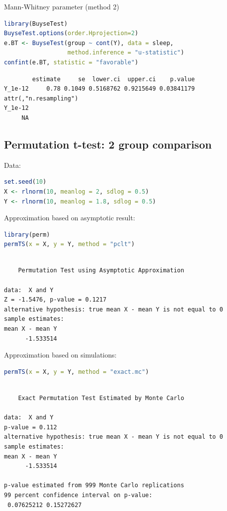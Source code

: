 \documentclass{article}
\begin{document}
Mann-Whitney parameter (method 2)
\begin{lstlisting}[language=r,numbers=none]
library(BuyseTest)
BuyseTest.options(order.Hprojection=2)
e.BT <- BuyseTest(group ~ cont(Y), data = sleep, 
                  method.inference = "u-statistic")
confint(e.BT, statistic = "favorable")
\end{lstlisting}

\label{}
\begin{verbatim}
        estimate     se  lower.ci  upper.ci    p.value
Y_1e-12     0.78 0.1049 0.5168762 0.9215649 0.03841179
attr(,"n.resampling")
Y_1e-12 
     NA
\end{verbatim}
\subsection{Permutation t-test: 2 group comparison}
\label{sec:orgd5ec848}

Data:
\begin{lstlisting}[language=r,numbers=none]
set.seed(10)
X <- rlnorm(10, meanlog = 2, sdlog = 0.5)
Y <- rlnorm(10, meanlog = 1.8, sdlog = 0.5)
\end{lstlisting}

Approximation based on asymptotic result:
\begin{lstlisting}[language=r,numbers=none]
library(perm)
permTS(x = X, y = Y, method = "pclt")
\end{lstlisting}

\label{}
\begin{verbatim}

	Permutation Test using Asymptotic Approximation

data:  X and Y
Z = -1.5476, p-value = 0.1217
alternative hypothesis: true mean X - mean Y is not equal to 0
sample estimates:
mean X - mean Y 
      -1.533514
\end{verbatim}


Approximation based on simulations:
\begin{lstlisting}[language=r,numbers=none]
permTS(x = X, y = Y, method = "exact.mc")
\end{lstlisting}

\label{}
\begin{verbatim}

	Exact Permutation Test Estimated by Monte Carlo

data:  X and Y
p-value = 0.112
alternative hypothesis: true mean X - mean Y is not equal to 0
sample estimates:
mean X - mean Y 
      -1.533514 

p-value estimated from 999 Monte Carlo replications
99 percent confidence interval on p-value:
 0.07625212 0.15272627
\end{verbatim}
\end{document}
